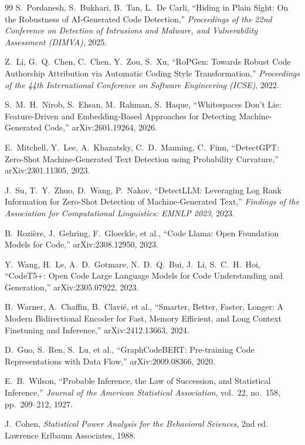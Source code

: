 \documentclass[sigconf,review,anonymous]{acmart}
\begin{document}
\begin{thebibliography}{99}
 S.~Pordanesh, S.~Bukhari, B.~Tan, L.~De Carli, ``Hiding in Plain Sight: On the Robustness of AI-Generated Code Detection,'' \emph{Proceedings of the 22nd Conference on Detection of Intrusions and Malware, and Vulnerability Assessment (DIMVA)}, 2025.

 Z.~Li, G.~Q.~Chen, C.~Chen, Y.~Zou, S.~Xu, ``RoPGen: Towards Robust Code Authorship Attribution via Automatic Coding Style Transformation,'' \emph{Proceedings of the 44th International Conference on Software Engineering (ICSE)}, 2022.

 S.~M.~H.~Nirob, S.~Ehsan, M.~Rahman, S.~Haque, ``Whitespaces Don't Lie: Feature-Driven and Embedding-Based Approaches for Detecting Machine-Generated Code,'' arXiv:2601.19264, 2026.

 E.~Mitchell, Y.~Lee, A.~Khazatsky, C.~D.~Manning, C.~Finn, ``DetectGPT: Zero-Shot Machine-Generated Text Detection using Probability Curvature,'' arXiv:2301.11305, 2023.

 J.~Su, T.~Y.~Zhuo, D.~Wang, P.~Nakov, ``DetectLLM: Leveraging Log Rank Information for Zero-Shot Detection of Machine-Generated Text,'' \emph{Findings of the Association for Computational Linguistics: EMNLP 2023}, 2023.

 B.~Rozi\`ere, J.~Gehring, F.~Gloeckle, et al., ``Code Llama: Open Foundation Models for Code,'' arXiv:2308.12950, 2023.

 Y.~Wang, H.~Le, A.~D.~Gotmare, N.~D.~Q.~Bui, J.~Li, S.~C.~H.~Hoi, ``CodeT5+: Open Code Large Language Models for Code Understanding and Generation,'' arXiv:2305.07922, 2023.

 B.~Warner, A.~Chaffin, B.~Clavi\'e, et al., ``Smarter, Better, Faster, Longer: A Modern Bidirectional Encoder for Fast, Memory Efficient, and Long Context Finetuning and Inference,'' arXiv:2412.13663, 2024.

 D.~Guo, S.~Ren, S.~Lu, et al., ``GraphCodeBERT: Pre-training Code Representations with Data Flow,'' arXiv:2009.08366, 2020.

 E.~B.~Wilson, ``Probable Inference, the Law of Succession, and Statistical Inference,'' \emph{Journal of the American Statistical Association}, vol.~22, no.~158, pp.~209--212, 1927.

 J.~Cohen, \emph{Statistical Power Analysis for the Behavioral Sciences}, 2nd ed. Lawrence Erlbaum Associates, 1988.

\end{thebibliography}
\end{document}
